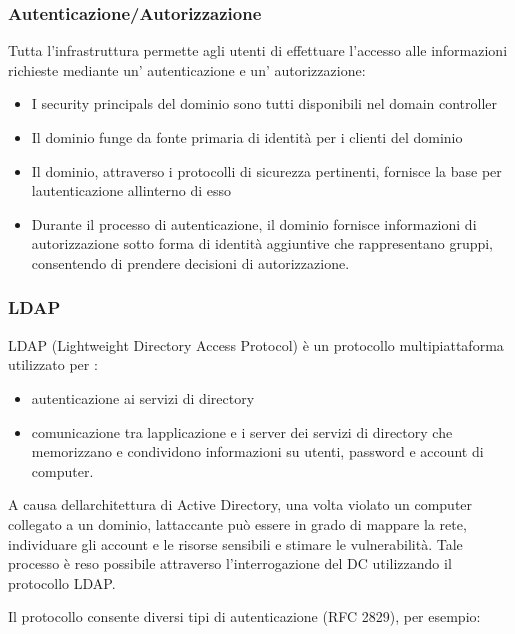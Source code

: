 \subsubsection{Autenticazione/Autorizzazione}\label{autenticazioneautorizzazione}

Tutta l'infrastruttura permette agli utenti di effettuare l'accesso alle
informazioni richieste mediante un' autenticazione e un' autorizzazione:

\begin{itemize}
\item
  I security principals del dominio sono tutti disponibili nel domain
  controller
\item
  Il dominio funge da fonte primaria di identità per i clienti del
  dominio
\item
  Il dominio, attraverso i protocolli di sicurezza pertinenti, fornisce
  la base per l\textquotesingle autenticazione
  all\textquotesingle interno di esso
\item
  Durante il processo di autenticazione, il dominio fornisce
  informazioni di autorizzazione sotto forma di identità aggiuntive che
  rappresentano gruppi, consentendo di prendere decisioni di
  autorizzazione.
\end{itemize}

\subsubsection{LDAP}\label{ldap}

LDAP (Lightweight Directory Access Protocol) è un protocollo
multipiattaforma utilizzato per :

\begin{itemize}
\item
  autenticazione ai servizi di directory
\item
  comunicazione tra l\textquotesingle applicazione e i server dei
  servizi di directory che memorizzano e condividono informazioni su
  utenti, password e account di computer.
\end{itemize}

A causa dell\textquotesingle architettura di Active Directory, una volta
violato un computer collegato a un dominio, l\textquotesingle attaccante
può essere in grado di mappare la rete, individuare gli account e le
risorse sensibili e stimare le vulnerabilità. Tale processo è reso
possibile attraverso l'interrogazione del DC utilizzando il protocollo
LDAP.

Il protocollo consente diversi tipi di autenticazione (RFC 2829), per
esempio:

